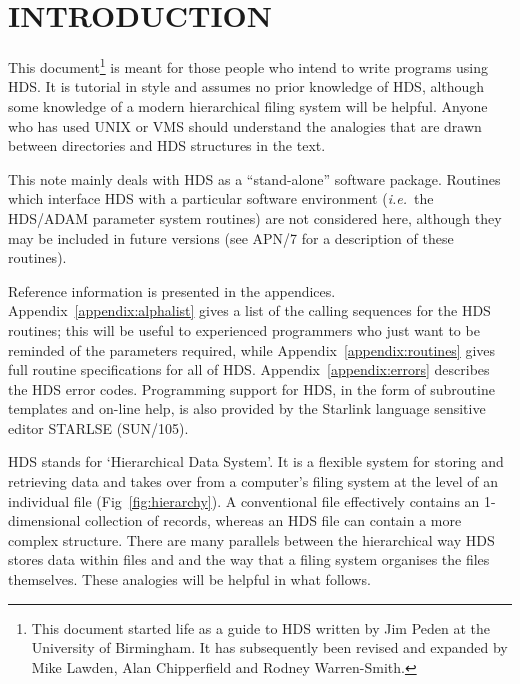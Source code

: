 \section {INTRODUCTION}

This document\footnote{This document started life as a guide to HDS written by
Jim Peden at the University of Birmingham. It has subsequently been revised and
expanded by Mike Lawden, Alan Chipperfield and Rodney Warren-Smith.} is meant
for those people who intend to write programs using HDS. It is tutorial in
style and assumes no prior knowledge of HDS, although some knowledge of a
modern hierarchical filing system will be helpful. Anyone who has used UNIX or
VMS should understand the analogies that are drawn between directories and HDS
structures in the text. 

This note mainly deals with HDS as a ``stand-alone'' software package. Routines
which interface HDS with a particular software environment ({\em i.e.}\ the
HDS/ADAM parameter system routines) are not considered here, although they may
be included in future versions (see APN/7 for a description of these routines).

Reference information is presented in the appendices.
Appendix~\ref{appendix:alphalist} gives a list of the calling sequences for the
HDS routines; this will be useful to experienced programmers who just want to
be reminded of the parameters required, while Appendix~\ref{appendix:routines}
gives full routine specifications for all of HDS.
Appendix~\ref{appendix:errors} describes the HDS error codes. Programming
support for HDS, in the form of subroutine templates and on-line help, is also
provided by the Starlink language sensitive editor STARLSE (SUN/105).

HDS stands for `Hierarchical Data System'. It is a flexible system for storing
and retrieving data and takes over from a computer's filing system at the level
of an individual file (Fig~\ref{fig:hierarchy}). A conventional file
effectively contains an 1-dimensional collection of records, whereas an HDS
file can contain a more complex structure. There are many parallels between the
hierarchical way HDS stores data within files and and the way that a filing
system organises the files themselves. These analogies will be helpful in what
follows. 

